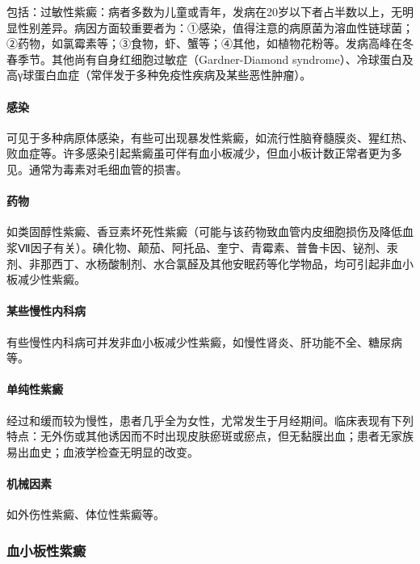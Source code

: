 包括：过敏性紫癜：病者多数为儿童或青年，发病在20岁以下者占半数以上，无明显性别差异。病因方面较重要者为：①感染，值得注意的病原菌为溶血性链球菌；②药物，如氯霉素等；③食物，虾、蟹等；④其他，如植物花粉等。发病高峰在冬春季节。其他尚有自身红细胞过敏症（Gardner-Diamond
syndrome）、冷球蛋白及高γ球蛋白血症（常伴发于多种免疫性疾病及某些恶性肿瘤）。

\paragraph{感染}

可见于多种病原体感染，有些可出现暴发性紫癜，如流行性脑脊髓膜炎、猩红热、败血症等。许多感染引起紫癜虽可伴有血小板减少，但血小板计数正常者更为多见。通常为毒素对毛细血管的损害。

\paragraph{药物}

如类固醇性紫癜、香豆素坏死性紫癜（可能与该药物致血管内皮细胞损伤及降低血浆Ⅶ因子有关）。碘化物、颠茄、阿托品、奎宁、青霉素、普鲁卡因、铋剂、汞剂、非那西丁、水杨酸制剂、水合氯醛及其他安眠药等化学物品，均可引起非血小板减少性紫癜。

\paragraph{某些慢性内科病}

有些慢性内科病可并发非血小板减少性紫癜，如慢性肾炎、肝功能不全、糖尿病等。

\paragraph{单纯性紫癜}

经过和缓而较为慢性，患者几乎全为女性，尤常发生于月经期间。临床表现有下列特点：无外伤或其他诱因而不时出现皮肤瘀斑或瘀点，但无黏膜出血；患者无家族易出血史；血液学检查无明显的改变。

\paragraph{机械因素}

如外伤性紫癜、体位性紫癜等。

\subsubsection{血小板性紫癜}

